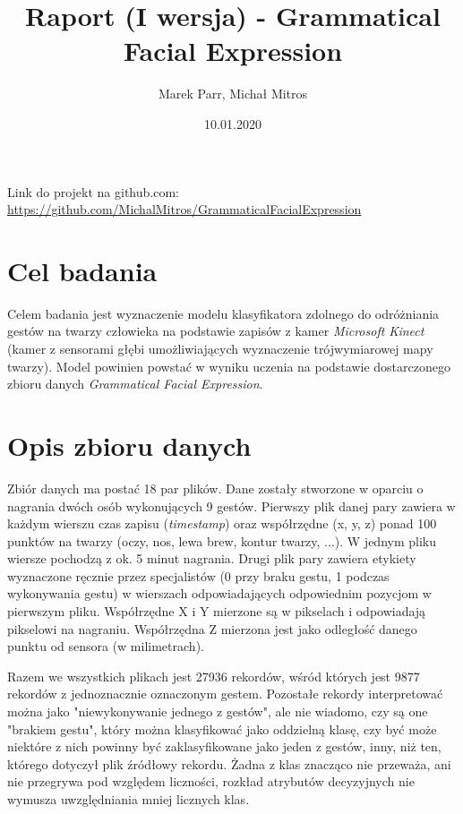 \documentclass[a4paper,12pt]{article}
\begin{document}
\title{Raport (I wersja) - Grammatical Facial Expression}
\author{Marek Parr, Michał Mitros}
\date{10.01.2020}
\maketitle

\newpage
Link do projekt na github.com:\\
\href{https://github.com/MichalMitros/GrammaticalFacialExpression}{https://github.com/MichalMitros/GrammaticalFacialExpression}
\section{Cel badania}
\hspace{1cm}Celem badania jest wyznaczenie modelu klasyfikatora zdolnego do odróżniania gestów na twarzy człowieka na podstawie zapisów z kamer \textsl{Microsoft Kinect} (kamer z sensorami głębi umożliwiających wyznaczenie trójwymiarowej mapy twarzy). Model powinien powstać w wyniku uczenia na podstawie dostarczonego zbioru danych \textsl{Grammatical Facial Expression}.

\section{Opis zbioru danych}
\hspace{1cm}Zbiór danych ma postać 18 par plików. Dane zostały stworzone w oparciu o nagrania dwóch osób wykonujących 9 gestów. Pierwszy plik danej pary zawiera w każdym wierszu czas zapisu (\textsl{timestamp}) oraz współrzędne (x, y, z) ponad 100 punktów na twarzy (oczy, nos, lewa brew, kontur twarzy, ...). W jednym pliku wiersze pochodzą z ok. 5 minut nagrania. Drugi plik pary zawiera etykiety wyznaczone ręcznie przez specjalistów (0 przy braku gestu, 1 podczas wykonywania gestu) w wierszach odpowiadających odpowiednim pozycjom w pierwszym pliku.\newline
Współrzędne X i Y mierzone są w pikselach i odpowiadają pikselowi na nagraniu. Współrzędna Z mierzona jest jako odległość danego punktu od sensora (w milimetrach).\newline

\hspace{1cm}Razem we wszystkich plikach jest 27936 rekordów, wśród których jest 9877 rekordów z jednoznacznie oznaczonym gestem. Pozostałe rekordy interpretować można jako "niewykonywanie jednego z gestów", ale nie wiadomo, czy są one "brakiem gestu", który można klasyfikować jako oddzielną klasę, czy być może niektóre z nich powinny być zaklasyfikowane jako jeden z gestów, inny, niż ten, którego dotyczył plik źródłowy rekordu. Żadna z klas znacząco nie przeważa, ani nie przegrywa pod względem liczności, rozkład atrybutów decyzyjnych nie wymusza uwzględniania mniej licznych klas.
\end{document}
